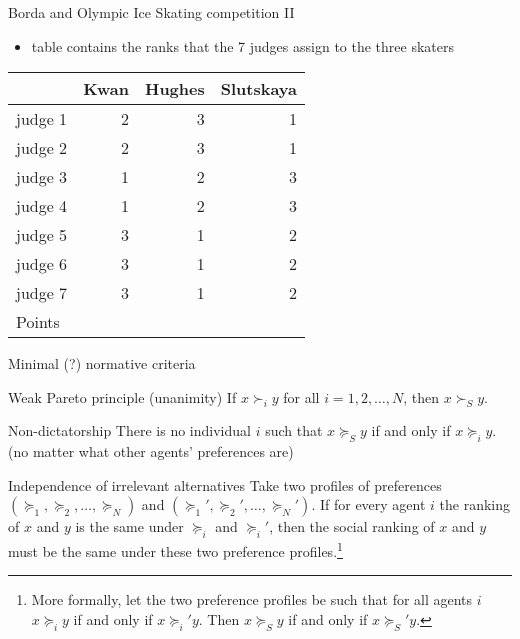 \documentclass[bigger]{beamer}
\begin{document}
\begin{frame}[label={sec:org1fa179e}]{Borda and Olympic Ice Skating  competition II}
\begin{itemize}
\item table contains the ranks that the 7 judges assign to the three skaters
\end{itemize}
\begin{center}
\begin{tabular}{l|rrr}
 & Kwan & Hughes & Slutskaya\\
\hline
judge 1 & 2 & 3 & 1\\
judge 2 & 2 & 3 & 1\\
judge 3 & 1 & 2 & 3\\
judge 4 & 1 & 2 & 3\\
judge 5 & 3 & 1 & 2\\
judge 6 & 3 & 1 & 2\\
judge 7 & 3 & 1 & 2\\
\hline
Points &  &  & \\
\end{tabular}
\end{center}
\end{frame}

\begin{frame}[label={sec:org4907224}]{Minimal (?) normative criteria}
\begin{block}{Weak Pareto principle (unanimity)}
If \(x\succ_i y\) for all \(i=1,2,\dots,N\), then \(x\succ_S y\).
\end{block}
\begin{block}{Non-dictatorship}
There is no individual \(i\) such that \(x\succeq_S y\) if and only if \(x\succeq_i y\). (no matter what other agents' preferences are)
\end{block}
\begin{block}{Independence of irrelevant alternatives}
Take two profiles of preferences \((\succeq_1,\succeq_2,\dots,\succeq_N)\) and \((\succeq_1',\succeq_2',\dots,\succeq_N')\). If for every agent \(i\) the ranking of \(x\) and \(y\) is the same under \(\succeq_i\) and \(\succeq_i'\), then the social ranking of \(x\) and \(y\) must be the same under these two preference profiles.\footnote{More formally, let the two preference profiles be such that for all agents $i$ $x\succeq_i y$ if and only if $x\succeq_i' y$. Then $x\succeq_S y$ if and only if $x \succeq_S' y$.}
\end{block}
\end{frame}
\end{document}
